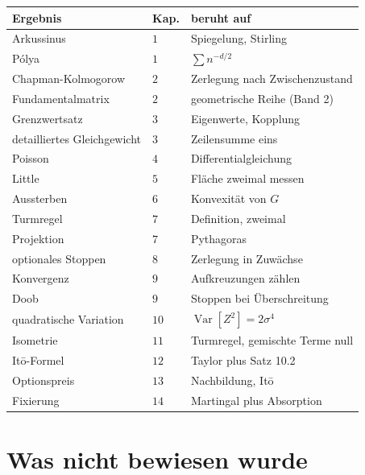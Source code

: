 \begin{merksatz}
\begin{center}
{\small
\renewcommand{\arraystretch}{1.4}
\begin{tabular}{@{}P{3.6cm}P{1.0cm}P{3.4cm}@{}}
\toprule
\textbf{Ergebnis} & \textbf{Kap.} & \textbf{beruht auf}\\
\midrule
Arkussinus & $1$ & Spiegelung, Stirling\\
Pólya & $1$ & $\sum n^{-d/2}$\\
Chapman-Kolmogorow & $2$ & Zerlegung nach Zwischenzustand\\
Fundamentalmatrix & $2$ & geometrische Reihe (Band 2)\\
Grenzwertsatz & $3$ & Eigenwerte, Kopplung\\
detailliertes Gleichgewicht & $3$ & Zeilensumme eins\\
Poisson & $4$ & Differentialgleichung\\
Little & $5$ & Fläche zweimal messen\\
Aussterben & $6$ & Konvexität von $G$\\
Turmregel & $7$ & Definition, zweimal\\
Projektion & $7$ & Pythagoras\\
optionales Stoppen & $8$ & Zerlegung in Zuwächse\\
Konvergenz & $9$ & Aufkreuzungen zählen\\
Doob & $9$ & Stoppen bei Überschreitung\\
quadratische Variation & $10$ & $\operatorname{Var}[Z^{2}] = 2\sigma^{4}$\\
Isometrie & $11$ & Turmregel, gemischte Terme null\\
Itō-Formel & $12$ & Taylor plus Satz 10.2\\
Optionspreis & $13$ & Nachbildung, Itō\\
Fixierung & $14$ & Martingal plus Absorption\\
\bottomrule
\end{tabular}}
\end{center}
\end{merksatz}

\section{Was nicht bewiesen wurde}

